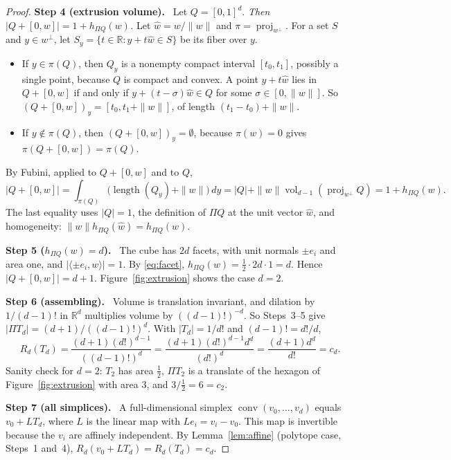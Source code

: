 \documentclass[11pt]{article}
\newcommand{\R}{\mathbb R}
\DeclareMathOperator{\conv}{conv}
\DeclareMathOperator{\vol}{vol}
\DeclareMathOperator{\proj}{proj}
\newcommand{\step}[1]{\par\smallskip\noindent\textbf{#1}\ }
\begin{document}
\begin{proof}
\step{Step 4 (extrusion volume).} Let \(Q=[0,1]^d\). \emph{Then
\(|Q+[0,w]|=1+h_{\Pi Q}(w)\).} Let \(\hat w=w/\|w\|\) and
\(\pi=\proj_{w^\perp}\). For a set \(S\) and \(y\in w^\perp\), let
\(S_y=\{t\in\R:y+t\hat w\in S\}\) be its fiber over \(y\).
\begin{itemize}[leftmargin=2em,itemsep=2pt]
\item If \(y\in\pi(Q)\), then \(Q_y\) is a nonempty compact interval
 \([t_0,t_1]\), possibly a single point, because \(Q\) is compact and
 convex. A point \(y+t\hat w\) lies in \(Q+[0,w]\) if and only if
 \(y+(t-\sigma)\hat w\in Q\) for some \(\sigma\in[0,\|w\|]\). So
 \((Q+[0,w])_y=[t_0,t_1+\|w\|]\), of length \((t_1-t_0)+\|w\|\).
\item If \(y\notin\pi(Q)\), then \((Q+[0,w])_y=\emptyset\), because
 \(\pi(w)=0\) gives \(\pi(Q+[0,w])=\pi(Q)\).
\end{itemize}
By Fubini, applied to \(Q+[0,w]\) and to \(Q\),
\[
 |Q+[0,w]|
 =\int_{\pi(Q)}\bigl(\operatorname{length}(Q_y)+\|w\|\bigr)\,dy
 =|Q|+\|w\|\vol_{d-1}(\proj_{w^\perp}Q)
 =1+h_{\Pi Q}(w).
\]
The last equality uses \(|Q|=1\), the definition of \(\Pi Q\) at the unit
vector \(\hat w\), and homogeneity: \(\|w\|h_{\Pi Q}(\hat w)=h_{\Pi Q}(w)\).

\step{Step 5 (\(h_{\Pi Q}(w)=d\)).} The cube has \(2d\) facets, with unit
normals \(\pm e_i\) and area one, and \(|\langle\pm e_i,w\rangle|=1\). By
\eqref{eq:facet}, \(h_{\Pi Q}(w)=\tfrac12\cdot2d\cdot1=d\). Hence
\(|Q+[0,w]|=d+1\). Figure~\ref{fig:extrusion} shows the case \(d=2\).

\step{Step 6 (assembling).} Volume is translation invariant, and dilation
by \(1/(d-1)!\) in \(\R^d\) multiplies volume by \(((d-1)!)^{-d}\). So
Steps~3--5 give \(|\Pi T_d|=(d+1)/((d-1)!)^d\). With \(|T_d|=1/d!\) and
\((d-1)!=d!/d\),
\[
 R_d(T_d)=\frac{(d+1)(d!)^{d-1}}{((d-1)!)^d}
 =\frac{(d+1)(d!)^{d-1}d^d}{(d!)^d}
 =\frac{(d+1)d^d}{d!}=c_d.
\]
Sanity check for \(d=2\): \(T_2\) has area \(\tfrac12\), \(\Pi T_2\) is a
translate of the hexagon of Figure~\ref{fig:extrusion} with area \(3\), and
\(3/\tfrac12=6=c_2\).

\step{Step 7 (all simplices).} A full-dimensional simplex
\(\conv(v_0,\dots,v_d)\) equals \(v_0+LT_d\), where \(L\) is the linear map
with \(Le_i=v_i-v_0\). This map is invertible because the \(v_i\) are
affinely independent. By Lemma~\ref{lem:affine} (polytope case, Steps~1
and~4), \(R_d(v_0+LT_d)=R_d(T_d)=c_d\).
\end{proof}
\end{document}
